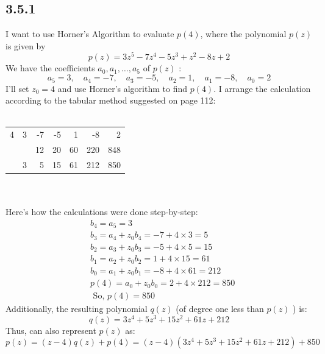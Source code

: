 \documentclass[manuscript,screen,review]{acmart}
\begin{document}
\subsection*{3.5.1}
I want to use Horner's Algorithm to evaluate $p(4)$, where the polynomial $p(z)$ is given by
$$
p(z)=3 z^5-7 z^4-5 z^3+z^2-8 z+2
$$
We have the coefficients $a_0, a_1, \ldots, a_5$ of $p(z)$ :
$$
a_5=3, \quad a_4=-7, \quad a_3=-5, \quad a_2=1, \quad a_1=-8, \quad a_0=2
$$
I'll set $z_0=4$ and use Horner's algorithm to find $p(4)$.
I arrange the calculation according to the tabular method suggested on page 112:
\\
\\
\begin{tabular}{r|rrrrrr}
4 & 3 & -7 & -5 & 1 & -8 & 2 \\
& & 12 & 20 & 60 & 220 & 848 \\
\hline & 3 & 5 & 15 & 61 & 212 & 850
\end{tabular}
\\
\\
Here's how the calculations were done step-by-step:
$$
\begin{aligned}
& b_4=a_5=3 \\
& b_3=a_4+z_0 b_4=-7+4 \times 3=5 \\
& b_2=a_3+z_0 b_3=-5+4 \times 5=15 \\
& b_1=a_2+z_0 b_2=1+4 \times 15=61 \\
& b_0=a_1+z_0 b_1=-8+4 \times 61=212 \\
& p(4)=a_0+z_0 b_0=2+4 \times 212=850 \\
& \text { So, } p(4)=850
\end{aligned}
$$
Additionally, the resulting polynomial $q(z)$ (of degree one less than $p(z)$ ) is:
$$
q(z)=3 z^4+5 z^3+15 z^2+61 z+212
$$
Thus, can also represent $p(z)$ as:
$$
p(z)=(z-4) q(z)+p(4)=(z-4)\left(3 z^4+5 z^3+15 z^2+61 z+212\right)+850
$$
\end{document}
